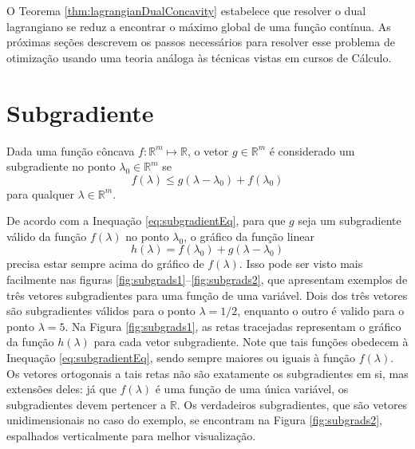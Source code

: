{O Teorema \ref{thm:lagrangianDualConcavity} estabelece que resolver o dual lagrangiano se reduz a encontrar o máximo global de uma função contínua. As próximas seções descrevem os passos necessários para resolver esse problema de otimização usando uma teoria análoga às técnicas vistas em cursos de Cálculo.

\section{Subgradiente}

Dada uma função côncava $f : \mathbb{R}^m \mapsto \mathbb{R} $, o vetor $g \in \mathbb{R}^m$ é considerado um subgradiente no ponto $\lambda_0 \in \mathbb{R}^m$ se
\begin{equation}
	f(\lambda) \leq g (\lambda - \lambda_0) + f(\lambda_0) \label{eq:subgradientEq}
\end{equation}
para qualquer $\lambda \in \mathbb{R}^m$. 

De acordo com a Inequação \eqref{eq:subgradientEq}, para que $g$ seja um subgradiente válido da função $f(\lambda)$ no ponto $\lambda_0$, o gráfico	da função linear
\[h(\lambda) = f(\lambda_0) + g(\lambda - \lambda_0) \] precisa estar sempre acima do gráfico de $f(\lambda)$. Isso pode ser visto mais facilmente nas figuras \ref{fig:subgrads1}--\ref{fig:subgrads2}, que apresentam exemplos de três vetores subgradientes para uma função de uma variável. Dois dos três vetores são subgradientes válidos para o ponto $\lambda = 1/2$, enquanto o outro é valido para o ponto $\lambda = 5$. Na Figura \ref{fig:subgrads1}, as retas tracejadas representam o gráfico da função $h(\lambda)$ para cada vetor subgradiente. Note que tais funções obedecem à Inequação \eqref{eq:subgradientEq}, sendo sempre maiores ou iguais à função $f(\lambda)$. Os vetores ortogonais a tais retas não são exatamente os subgradientes em si, mas extensões deles: já que $f(\lambda)$ é uma função de uma única variável, os subgradientes devem pertencer a $\mathbb{R}$. Os verdadeiros subgradientes, que são vetores unidimensionais no caso do exemplo, se encontram na Figura \ref{fig:subgrads2}, espalhados verticalmente para melhor visualização.

\begin{figure}[htpb!]
	\centering
\end{figure}}
